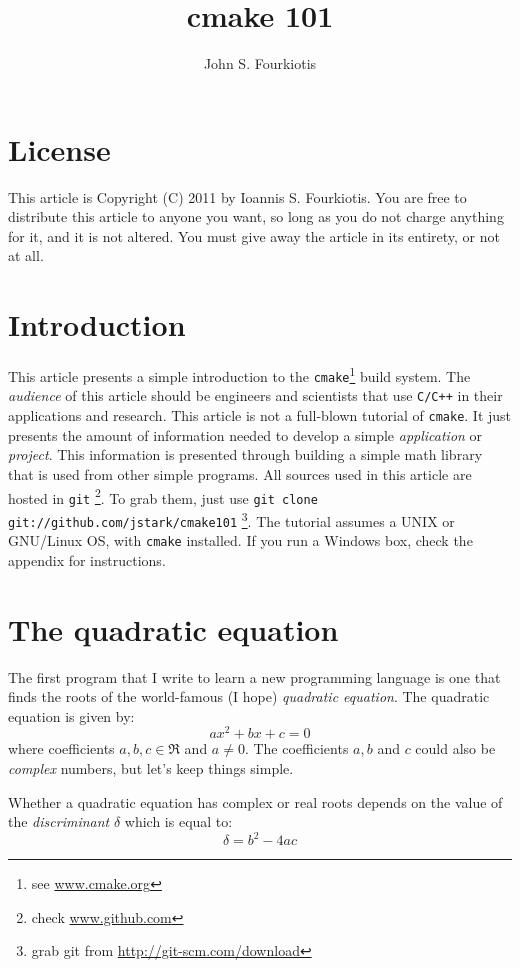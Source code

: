\documentclass[12pt,a4paper]{article}
\author{John S. Fourkiotis}
\title{cmake 101}
\begin{document}
\maketitle
\tableofcontents
\section*{License}
This article is Copyright (C) 2011 by Ioannis S. Fourkiotis. You are free to distribute this article to anyone you want, so long as you do not charge anything for it, and it is not altered. You must give away the article in its entirety, or not at all.
\section{Introduction}
This article presents a simple introduction to the \verb+cmake+\footnote{see \href{www.cmake.org}{www.cmake.org}} build system. The \emph{audience} of this article should be engineers and scientists that use \verb|C/C++| in their applications and research. This article is not a full-blown tutorial of \verb+cmake+. It just presents the amount of information needed to develop a simple \emph{application} or \emph{project}. This information is presented through building a simple math library that is used from other simple programs. All sources used in this article are hosted in \verb|git| \footnote{check \href{www.github.com}{www.github.com}}. To grab them, just use \verb|git clone git://github.com/jstark/cmake101| \footnote{grab git from \href{http://git-scm.com/download}{http://git-scm.com/download}}. The tutorial assumes a UNIX or GNU/Linux OS, with \verb+cmake+ installed. If you run a Windows box, check the appendix for instructions.
\section{The quadratic equation}
The first program that I write to learn a new programming language is one that finds the roots of the world-famous (I hope) \emph{quadratic equation}. The quadratic equation is given by:
\begin{equation}
ax^2+bx+c = 0
\end{equation}
where coefficients $a,b,c\in \Re$ and $a\neq0$. The coefficients $a,b$ and $c$ could also be \emph{complex} numbers, but let's keep things simple. 

Whether a quadratic equation has complex or real roots depends on the value of the \emph{discriminant} $\delta$ which is equal to:
\[
\delta = b^2-4ac
\]
\end{document}
